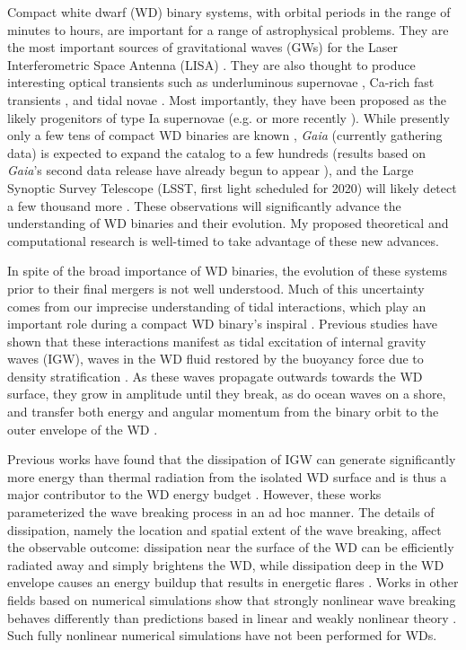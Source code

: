 \documentclass[
        fleqn,
        usenatbib,
    ]{mnras}
\begin{document}
Compact white dwarf (WD) binary systems, with orbital periods in the range of
minutes to hours, are important for a range of astrophysical problems. They are
the most important sources of gravitational waves (GWs) for the Laser
Interferometric Space Antenna (LISA) \citep{lisa}. They are also thought to
produce interesting optical transients such as underluminous
supernovae \citep{underlum}, Ca-rich fast transients \citep{carich}, and tidal
novae \citep{tidal_novae}. Most importantly, they have been proposed as the likely
progenitors of type Ia supernovae (e.g. \citep{Ia0,webbink} or more
recently \citep{Ia1,Ia2}). While presently only a few tens of compact WD binaries
are known \citep{lsst_wd}, \emph{Gaia} (currently gathering data) is expected to
expand the catalog to a few hundreds \citep{lsst_wd} (results based on
\emph{Gaia}'s second data release have already begun to
appear \citep{gaiaDD,gaiaDD2}), and the Large Synoptic Survey Telescope (LSST,
first light scheduled for 2020) will likely detect a few thousand
more \citep{lsst_wd}. These observations will significantly advance the
understanding of WD binaries and their evolution. My proposed theoretical and
computational research is well-timed to take advantage of these new advances.

In spite of the broad importance of WD binaries, the evolution of these systems
prior to their final mergers is not well understood. Much of this uncertainty
comes from our imprecise understanding of tidal interactions, which play an
important role during a compact WD binary's inspiral \citep{fullerII}. Previous
studies have shown that these interactions manifest as tidal excitation of
internal gravity waves (IGW), waves in the WD fluid restored by the buoyancy
force due to density stratification \citep{fullerI}. As these waves propagate
outwards towards the WD surface, they grow in amplitude until they break, as do
ocean waves on a shore, and transfer both energy and angular momentum from the
binary orbit to the outer envelope of the WD \citep{fullerI,fullerII}.

Previous works have found that the dissipation of IGW can generate significantly
more energy than thermal radiation from the isolated WD surface and is thus a
major contributor to the WD energy budget \citep{fullerII,fullerIV}. However,
these works parameterized the wave breaking process in an ad hoc manner. The
details of dissipation, namely the location and spatial extent of the wave
breaking, affect the observable outcome: dissipation near the surface of the WD
can be efficiently radiated away and simply brightens the WD, while dissipation
deep in the WD envelope causes an energy buildup that results in energetic
flares \citep{tidal_novae}. Works in other fields based on numerical simulations
show that strongly nonlinear wave breaking behaves differently than predictions
based in linear and weakly nonlinear theory \citep{winters1994,barker_ogilvie}.
Such fully nonlinear numerical simulations have not been performed for WDs.
\end{document}
